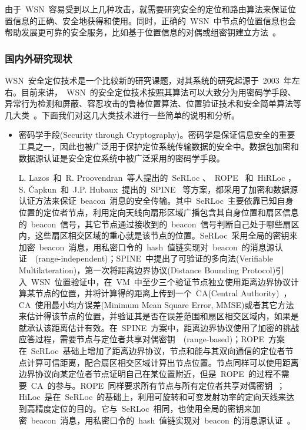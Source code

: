 \documentclass[a4paper,10pt]{article}
\begin{document}
由于~WSN~容易受到以上几种攻击，就需要研究安全的定位和路由算法来保证位置信息的正确、安全地获得和使用。同时，正确的~WSN~中节点的位置信息也会帮助发展更可靠的安全服务，比如基于位置信息的对偶或组密钥建立方法~\cite{Liu2003,Huang2004}。

\subsubsection{国内外研究现状}  

WSN~安全定位技术是一个比较新的研究课题，对其系统的研究起源于~2003~年左右。目前来讲，~WSN~的安全定位技术按照其算法可以大致分为用密码学手段、异常行为检测和屏蔽、容忍攻击的鲁棒位置算法、位置验证技术和安全简单算法等几大类~\cite{Boukerche2008}。下面我们对这几大类技术进行一些简单的说明和分析。

\begin{itemize}

\item 密码学手段(Security through Cryptography)。密码学是保证信息安全的重要工具之一，因此也被广泛用于保护定位系统传输数据的安全中。数据包加密和数据源认证是安全定位系统中被广泛采用的密码学手段。

L. Lazos~和~R. Proovendran~等人提出的~SeRLoc \cite{Lazos2005}、~ROPE \cite{Lazos2006}~和~HiRLoc \cite{Lazos2005a}，S. \v{C}apkun~和~J.P. Hubaux~提出的~SPINE \cite{Capkun2005}~等方案，都采用了加密和数据源认证方法来保证~beacon~消息的安全传输。其中~SeRLoc~主要依靠已知自身位置的定位者节点，利用定向天线向扇形区域广播包含其自身位置和扇区信息的~beacon~信号，其它节点通过接收到的~beacon~信号判断自己处于哪些扇区内，这些扇区相交区域的重心就是该节点的位置。SeRLoc~采用全局的密钥来加密~beacon~消息，用私密口令的~hash~值链实现对~beacon~的消息源认证~\cite{Lazos2005}~(range-independent)；SPINE~中提出了可验证的多向法(Verifiable Multilateration)，第一次将距离边界协议(Distance Bounding Protocol)引入~WSN~位置验证中，在~VM~中至少三个验证节点独立使用距离边界协议计算某节点的位置，并将计算得的距离上传到一个~CA(Central Authority)~，CA~使用最小均方误差(Minimum Mean Square Error, MMSE)或者其它方法来估计得该节点的位置，并验证其是否在误差范围和扇区相交区域内，如果是就承认该距离估计有效。在~SPINE~方案中，距离边界协议使用了加密的挑战应答过程，需要节点与定位者共享对偶密钥~\cite{Capkun2005}~(range-based)；ROPE~方案在~SeRLoc~基础上增加了距离边界协议，节点和能与其双向通信的定位者节点计算可信距离，配合扇区相交区域计算出节点位置。节点同样可以使用距离边界协议向某定位者节点证明自己在某位置附近，但是~ROPE~的过程不需要~CA~的参与。ROPE~同样要求所有节点与所有定位者共享对偶密钥~\cite{Lazos2006}；HiLoc~是在~SeRLoc~的基础上，利用可旋转和可变发射功率的定向天线来达到高精度定位的目的。它与~SeRLoc~相同，也使用全局的密钥来加密~beacon~消息，用私密口令的~hash~值链实现对~beacon~的消息源认证~\cite{Lazos2005a}。


\end{itemize}
\end{document}
